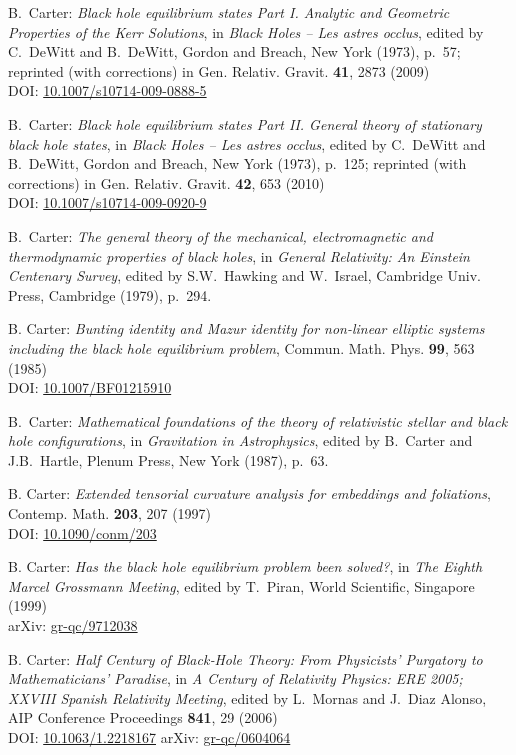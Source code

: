 \begin{thebibliography}{123}
B.~Carter:
{\em Black hole equilibrium states Part I.
Analytic and Geometric Properties of the Kerr Solutions},
in {\em Black Holes -- Les astres occlus},  edited by C.~DeWitt and B.~DeWitt,
Gordon and Breach, New York (1973), p.~57; reprinted (with corrections) in
Gen. Relativ. Gravit. {\bf 41}, 2873 (2009)\\
DOI: \href{https://doi.org/10.1007/s10714-009-0888-5}{10.1007/s10714-009-0888-5}

B.~Carter:
{\em Black hole equilibrium states Part II. General theory of stationary black hole states}, in {\em Black Holes -- Les astres occlus}, edited by C.~DeWitt and B.~DeWitt,
Gordon and Breach, New York (1973), p.~125; reprinted (with corrections) in
Gen. Relativ. Gravit. {\bf 42}, 653 (2010)\\
DOI: \href{https://doi.org/10.1007/s10714-009-0920-9}{10.1007/s10714-009-0920-9}

B.~Carter:
{\em The general theory of the mechanical, electromagnetic and thermodynamic properties of black holes}, in {\em General Relativity: An Einstein Centenary Survey},
edited by S.W.~Hawking and W.~Israel,
Cambridge Univ. Press, Cambridge (1979), p.~294.

B. Carter:
{\em Bunting identity and Mazur identity for non-linear elliptic systems including the black hole equilibrium problem},
Commun. Math. Phys. {\bf 99}, 563 (1985)\\
DOI: \href{https://doi.org/10.1007/BF01215910}{10.1007/BF01215910}

B.~Carter:
{\em Mathematical foundations of the theory of
relativistic stellar and black hole configurations},
in {\em Gravitation in Astrophysics}, edited by B.~Carter and J.B.~Hartle,
Plenum Press, New York (1987), p.~63.

B. Carter:
{\em Extended tensorial curvature analysis for embeddings and foliations},
Contemp. Math. {\bf 203}, 207 (1997)\\
DOI: \href{http://dx.doi.org/10.1090/conm/203}{10.1090/conm/203}

B. Carter: {\em Has the black hole equilibrium problem been solved?},
in {\em The Eighth Marcel Grossmann Meeting}, edited by T.~Piran,
World Scientific, Singapore (1999)\\
arXiv: \href{https://arxiv.org/abs/gr-qc/9712038}{gr-qc/9712038}

B. Carter:
{\em Half Century of Black‐Hole Theory: From Physicists' Purgatory to Mathematicians' Paradise},
in {\em A Century of Relativity Physics: ERE 2005; XXVIII Spanish Relativity Meeting},
edited by L.~Mornas and J.~Diaz Alonso,
AIP Conference Proceedings {\bf 841}, 29 (2006)\\
DOI: \href{https://doi.org/10.1063/1.2218167}{10.1063/1.2218167}\hfill
arXiv: \href{https://arxiv.org/abs/gr-qc/0604064}{gr-qc/0604064}


\end{thebibliography}
